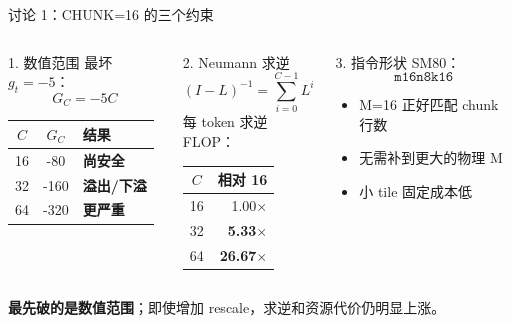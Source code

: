 \documentclass[aspectratio=169,10pt]{beamer}
\newcommand{\good}[1]{\textcolor{KdaGreen}{\ifmmode\boldsymbol{#1}\else\textbf{#1}\fi}}
\newcommand{\bad}[1]{\textcolor{KdaRed}{\ifmmode\boldsymbol{#1}\else\textbf{#1}\fi}}
\newcommand{\code}[1]{\texttt{#1}}
\begin{document}
\begin{frame}{讨论 1：CHUNK=16 的三个约束}
  \begin{columns}[T,onlytextwidth]
      \begin{block}{1. 数值范围}
        最坏 $g_t=-5$：
        \[
          G_C=-5C
        \]
        \begin{tabular}{ccl}
          $C$ & $G_C$ & 结果 \\
          \hline
          16 & -80 & \good{尚安全} \\
          32 & -160 & \bad{溢出/下溢} \\
          64 & -320 & \bad{更严重}
        \end{tabular}
      \end{block}

      \begin{block}{2. Neumann 求逆}
        \[
          (I-L)^{-1}=\sum_{i=0}^{C-1}L^i
        \]
        每 token 求逆 FLOP：
        \begin{tabular}{cr}
          $C$ & 相对 16 \\
          \hline
          16 & 1.00$\times$ \\
          32 & \bad{5.33$\times$} \\
          64 & \bad{26.67$\times$}
        \end{tabular}
      \end{block}

      \begin{block}{3. 指令形状}
        SM80：
        \[
          \code{m16n8k16}
        \]
        \begin{itemize}
          \item M=16 正好匹配 chunk 行数
          \item 无需补到更大的物理 M
          \item 小 tile 固定成本低
        \end{itemize}
      \end{block}
  \end{columns}

  \vspace{0.4em}
  \centering\large
  \bad{最先破的是数值范围}；即使增加 rescale，求逆和资源代价仍明显上涨。

\end{frame}
\end{document}
